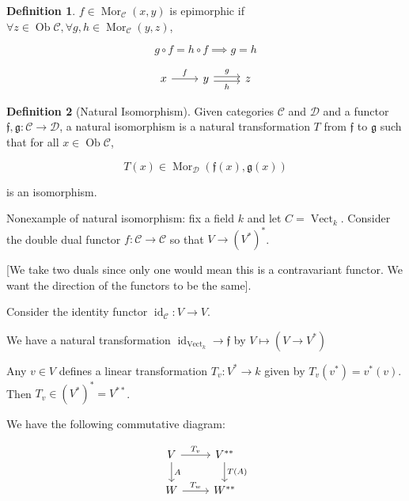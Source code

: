 \documentclass{article}
\theoremstyle{definition}
\newtheorem*{definition}{Definition}
\begin{document}
    \begin{definition}
        \(f \in \operatorname{Mor}_{\mathcal{C}}(x,y)\) is epimorphic if \(\forall z\in \operatorname{Ob}\mathcal{C}, \forall g,h\in \operatorname{Mor}_{\mathcal{C}}(y,z)\),
        
        \[
            g \circ f = h \circ  f \implies g = h
        \]

        \[
            \begin{tikzcd}
                x \ar[r,"f"] & y \ar[r, shift left = 2pt, "g"] \ar[r, shift right = 2pt, "h"'] & z
            \end{tikzcd}
        \]
    \end{definition} 

    \begin{definition}
        [Natural Isomorphism] Given categories \(\mathcal{C}\) and \(\mathcal{D}\) and a functor \(\mathfrak{f}, \mathfrak{g}: \mathcal{C} \to \mathcal{D}\), a natural isomorphism is a natural transformation \(T\) from \(\mathfrak{f}\) to \(\mathfrak{g}\) such that for all \(x\in \operatorname{Ob} \mathcal{C}\),

        \[
            T(x) \in \operatorname{Mor}_{\mathcal{D}}(\mathfrak{f}(x), \mathfrak{g} (x))
        \]

        is an isomorphism.
    \end{definition}

    Nonexample of natural isomorphism: fix a field \(k\) and let \(C = \operatorname{Vect}_k\). Consider the double dual functor \(f: \mathcal{C} \to \mathcal{C}\) so that \(V \to (V^{\ast})^{\ast}\).

    [We take two duals since only one would mean this is a contravariant functor. We want the direction of the functors to be the same].

    Consider the identity functor \(\operatorname{id}_{\mathcal{C}}: V \to V\).
    
    We have a natural transformation \(\operatorname{id}_{\operatorname{Vect}_k} \to \mathfrak{f}\) by \(V \mapsto (V \to V^{\ast})\)
    
    Any \(v\in V\) defines a linear transformation \(T_v : V^{\ast} \to k\) given by \(T_v(v^{\ast}) = v^{\ast} (v)\). Then \(T_v \in (V^{\ast})^{\ast} = V^{\ast\ast}\).
    
    We have the following commutative diagram:

    \[
        \begin{tikzcd}
            V \ar[r,"T_v"] \ar[d,"A"] & V^{\ast\ast} \ar[d,"T(A)"] \\ W \ar[r,"T_w"] & W^{\ast\ast} 
        \end{tikzcd}
    \]
\end{document}
